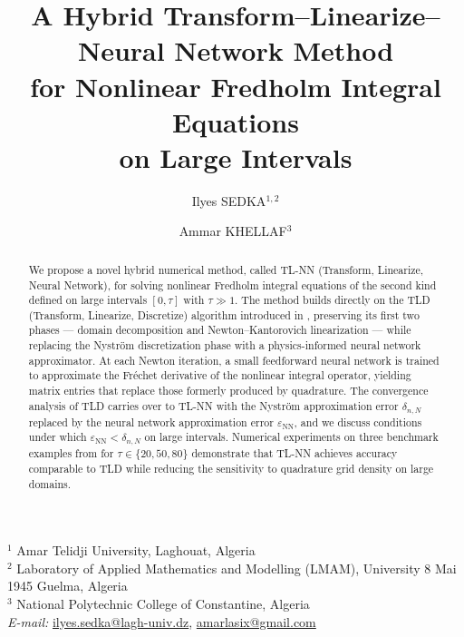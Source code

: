 \documentclass[12pt, a4paper]{article}
\newcommand{\epsNN}{\varepsilon_{\mathrm{NN}}}
\begin{document}
\doublespacing

\title{\textbf{A Hybrid Transform--Linearize--Neural Network Method\\
for Nonlinear Fredholm Integral Equations\\
on Large Intervals}}

\author{
  Ilyes SEDKA$^{1,2}$ \and Ammar KHELLAF$^{3}$
}

\date{}
\maketitle

\begin{center}
{\small
$^{1}$ Amar Telidji University, Laghouat, Algeria \\
$^{2}$ Laboratory of Applied Mathematics and Modelling (LMAM),
University 8 Mai 1945 Guelma, Algeria \\
$^{3}$ National Polytechnic College of Constantine, Algeria \\[6pt]
\textit{E-mail:} \href{mailto:ilyes.sedka@lagh-univ.dz}{ilyes.sedka@lagh-univ.dz},
\href{mailto:amarlasix@gmail.com}{amarlasix@gmail.com}
}
\end{center}

\vspace{1cm}

\begin{abstract}
We propose a novel hybrid numerical method, called TL-NN
(Transform, Linearize, Neural Network), for solving nonlinear
Fredholm integral equations of the second kind defined on large
intervals $[0, \tau]$ with $\tau \gg 1$.
The method builds directly on the TLD (Transform, Linearize,
Discretize) algorithm introduced in \cite{sedka2025},
preserving its first two phases --- domain decomposition and
Newton--Kantorovich linearization --- while replacing the
Nystr\"{o}m discretization phase with a physics-informed
neural network approximator.
At each Newton iteration, a small feedforward neural network
is trained to approximate the Fr\'{e}chet derivative of the
nonlinear integral operator, yielding matrix entries that
replace those formerly produced by quadrature.
The convergence analysis of TLD carries over to TL-NN with
the Nystr\"{o}m approximation error $\delta_{n,N}$ replaced
by the neural network approximation error $\epsNN$, and we
discuss conditions under which $\epsNN < \delta_{n,N}$ on
large intervals.
Numerical experiments on three benchmark examples from
\cite{sedka2025} for $\tau \in \{20, 50, 80\}$ demonstrate
that TL-NN achieves accuracy comparable to TLD while reducing
the sensitivity to quadrature grid density on large domains.
\end{abstract}
\end{document}
